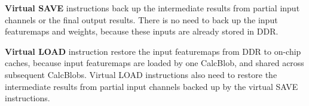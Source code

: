 \textbf{Virtual SAVE} instructions back up the intermediate results from partial input channels or the final output results. There is no need to back up the input featuremaps and weights, because these inputs are already stored in DDR. 

\textbf{Virtual LOAD} instruction restore the input featuremaps from DDR to on-chip caches, because input featuremaps are loaded by one CalcBlob, and shared across subsequent CalcBlobs.
Virtual LOAD instructions also need to restore the intermediate results from partial input channels backed up by the virtual SAVE instructions.









